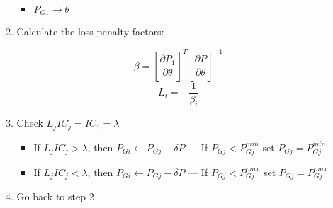 \begin{itemize}
\begin{enumerate}
        \begin{itemize}

          \item $P_{G1}\to\theta$

        \end{itemize}

      \item Calculate the loss penalty factors:

        $$\beta=\left[ \frac{\partial P_1}{\partial\theta} \right]^{T}\left[ \frac{\partial P}{\partial \theta} \right]^{-1}$$
        $$L_i=-\frac{1}{\beta_i}$$

      \item Check $L_jIC_j=IC_1=\lambda$

        \begin{itemize}

          \item If $L_jIC_j>\lambda$, then $P_{Gi}\leftarrow P_{Gj}-\delta P$ — If $P_{Gj}<P_{Gj}^{min}$ set $P_{Gj}=P_{Gj}^{min}$

          \item If $L_jIC_j<\lambda$, then $P_{Gi}\leftarrow P_{Gj}-\delta P$ — If $P_{Gj}<P_{Gj}^{max}$ set $P_{Gj}=P_{Gj}^{max}$
            
        \end{itemize}

      \item Go back to step 2

    \end{enumerate}

\end{itemize}



